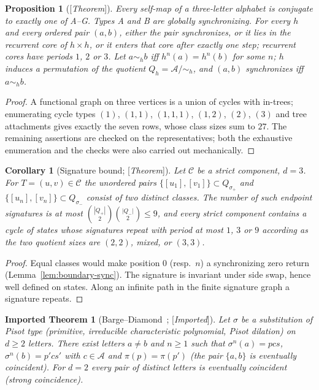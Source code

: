 \documentclass[11pt]{amsart}
\theoremstyle{plain}
\newtheorem{proposition}[theorem]{Proposition}
\newtheorem{corollary}[theorem]{Corollary}
\newtheorem{importedtheorem}[theorem]{Imported Theorem}
\theoremstyle{definition}
\theoremstyle{remark}
\newcommand{\A}{\mathcal{A}}
\newcommand{\cC}{\mathcal{C}}
\newcommand{\Status}[1]{\textup{[\textit{#1}]}}
\begin{document}
\begin{proposition}[\Status{Theorem}]\label{prop:endpoint-types}
Every self-map of a three-letter alphabet is conjugate to exactly one of A--G. Types A and B are globally synchronizing. For every $h$ and every ordered pair $(a,b)$, either the pair synchronizes, or it lies in the recurrent core of $h\times h$, or it enters that core after exactly one step; recurrent cores have periods $1$, $2$ or $3$. Let $a\sim_hb$ iff $h^n(a)=h^n(b)$ for some $n$; $h$ induces a permutation of the quotient $Q_h=\A/{\sim_h}$, and $(a,b)$ synchronizes iff $a\sim_hb$.
\end{proposition}
\begin{proof}
A functional graph on three vertices is a union of cycles with in-trees; enumerating cycle types $(1)$, $(1,1)$, $(1,1,1)$, $(1,2)$, $(2)$, $(3)$ and tree attachments gives exactly the seven rows, whose class sizes sum to $27$. The remaining assertions are checked on the representatives; both the exhaustive enumeration and the checks were also carried out mechanically.
\end{proof}

\begin{corollary}[Signature bound; \Status{Theorem}]\label{cor:signature}
Let $\cC$ be a strict component, $d=3$. For $T=(u,v)\in\cC$ the unordered pairs $\{[u_1],[v_1]\}\subset Q_{\sigma_+}$ and $\{[u_n],[v_n]\}\subset Q_{\sigma_-}$ consist of two distinct classes. The number of such \emph{endpoint signatures} is at most $\binom{|Q_+|}{2}\binom{|Q_-|}{2}\le9$, and every strict component contains a cycle of states whose signatures repeat with period at most $1$, $3$ or $9$ according as the two quotient sizes are $(2,2)$, mixed, or $(3,3)$.
\end{corollary}
\begin{proof}
Equal classes would make position $0$ (resp.\ $n$) a synchronizing zero return (Lemma~\ref{lem:boundary-sync}). The signature is invariant under side swap, hence well defined on states. Along an infinite path in the finite signature graph a signature repeats.
\end{proof}

\begin{importedtheorem}[Barge--Diamond~\cite{BD}; \Status{Imported}]\label{thm:BD}
Let $\sigma$ be a substitution of Pisot type (primitive, irreducible characteristic polynomial, Pisot dilation) on $d\ge2$ letters. There exist letters $a\ne b$ and $n\ge1$ such that $\sigma^n(a)=pcs$, $\sigma^n(b)=p'cs'$ with $c\in\A$ and $\pi(p)=\pi(p')$ (the pair $\{a,b\}$ is \emph{eventually coincident}). For $d=2$ every pair of distinct letters is eventually coincident (strong coincidence).
\end{importedtheorem}
\end{document}
